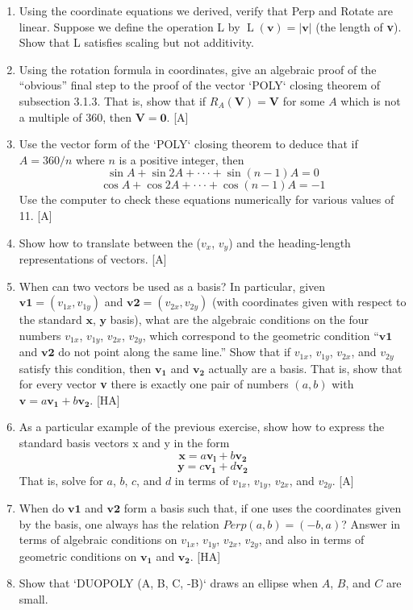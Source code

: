 \documentclass{book}
\begin{document}
\begin{enumerate}
\item Using the coordinate equations we derived, verify that Perp and
Rotate are linear. Suppose we define the operation L by $\operatorname{L}(\mathbf{v}) = |\mathbf{v}|$ (the
length of \textbf{v}). Show that L satisfies scaling but not additivity.
\item Using the rotation formula in coordinates, give an algebraic proof of
the ``obvious'' final step to the proof of the vector \textsc{`POLY`} closing theorem
of subsection 3.1.3. That is, show that if $R_A(\mathbf{V}) = \mathbf{V}$ for some $A$ which
is not a multiple of 360, then $\mathbf{V} = \mathbf{0}$. [A]
\item Use the vector form of the \textsc{`POLY`} closing theorem to deduce that if
$A = 360 / n$ where $n$ is a positive integer, then
$$\sin A + \sin 2A + \cdot \cdot \cdot + \sin (n - 1) A = 0$$
$$\cos A + \cos 2A + \cdot \cdot \cdot + \cos (n- 1) A =  -1$$
Use the computer to check these equations numerically for various values
of 11. [A]
\item Show how to translate between the ($v_x$, $v_y$) and the heading-length
representations of vectors. [A]
\item When can two vectors be used as a basis? In particular, given $\mathbf{v1} = (v_{1x}, v_{1y})$ 
and $\mathbf{v2} = (v_{2x}, v_{2y})$ (with coordinates given with respect to
the standard $\mathbf{x}$, $\mathbf{y}$ basis), what are the algebraic conditions on the four
numbers $v_{1x}$, $v_{1y}$, $v_{2x}$, $v_{2y}$, which correspond to the geometric condition
``$\mathbf{v1}$ and $\mathbf{v2}$ do not point along the same line.'' Show that if $v_{1x}$, $v_{1y}$, $v_{2x}$,
and $v_{2y}$ satisfy this condition, then $\mathbf{v_1}$ and $\mathbf{v_2}$ actually are a basis. That
is, show that for every vector \textbf{v} there is exactly one pair of numbers $(a, b)$
with  $\mathbf{v} = a\mathbf{v_1} + b\mathbf{v_2}$. [HA]
\item As a particular example of the previous exercise, show how to express
the standard basis vectors x and y in the form
$$\mathbf{x} = a\mathbf{v_l} + b\mathbf{v_2}$$
$$\mathbf{y} = c\mathbf{v_1} + d\mathbf{v_2}$$ That is, solve for $a$, $b$, $c$, and $d$ in terms of $v_{1x}$, $v_{1y}$, $v_{2x}$, and $v_{2y}$. [A]
\item When do $\mathbf{v1}$ and $\mathbf{v2}$ form a basis such that, if one uses the coordinates
given by the basis, one always has the relation $Perp(a, b) = (-b, a)$?
Answer in terms of algebraic conditions on $v_{1x}$, $v_{1y}$, $v_{2x}$, $v_{2y}$, and also
in terms of geometric conditions on $\mathbf{v_1}$ and $\mathbf{v_2}$. [HA]
\item Show that \textsc{`DUOPOLY (A, B, C, -B)`} draws an ellipse when $A$, $B$, and
$C$ are small.  
\end{enumerate}
\end{document}
